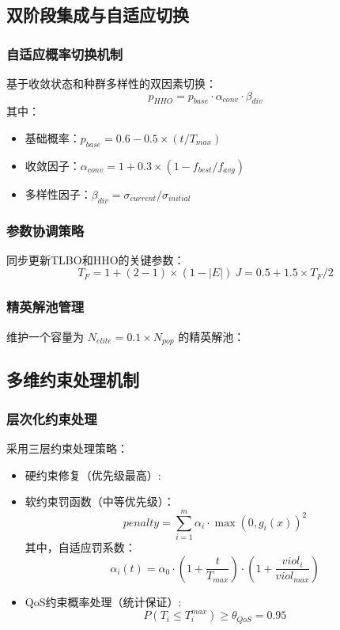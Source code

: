 \documentclass[conference]{IEEEtran}
\begin{document}
\subsection{双阶段集成与自适应切换}
\subsubsection{自适应概率切换机制}
基于收敛状态和种群多样性的双因素切换：
\begin{equation}
p_{HHO} = p_{base} \cdot \alpha_{conv} \cdot \beta_{div}
\end{equation}
其中：
\begin{itemize}
    \item 基础概率：$p_{base} = 0.6 - 0.5 \times (t/T_{max})$
    \item 收敛因子：$\alpha_{conv} = 1 + 0.3 \times (1 - f_{best}/f_{avg})$
    \item 多样性因子：$\beta_{div} =\sigma_{current}/\sigma_{initial}$
\end{itemize}
\subsubsection{参数协调策略}
同步更新TLBO和HHO的关键参数：
\begin{equation}
T_F = 1 + (2 - 1) \times (1 - |E|) \
J = 0.5 + 1.5 \times T_F / 2
\end{equation}
\subsubsection{精英解池管理}
维护一个容量为 $N_{elite} = 0.1 \times N_{pop}$ 的精英解池：
\subsection{多维约束处理机制}
\subsubsection{层次化约束处理}
采用三层约束处理策略：
\begin{itemize}
    \item 硬约束修复（优先级最高）:
    \item 软约束罚函数（中等优先级）：
        \begin{equation}
            penalty = \sum_{i=1}^{m} \alpha_i \cdot \max(0, g_i(x))^2
        \end{equation}
        其中，自适应罚系数：
        \begin{equation}
            \alpha_i(t) = \alpha_0 \cdot \left(1 + \frac{t}{T_{max}}\right) \cdot \left(1 + \frac{viol_i}{viol_{max}}\right)
        \end{equation}
    \item QoS约束概率处理（统计保证）:
        \begin{equation}
            P(T_i \leq T_i^{max}) \geq \theta_{QoS} = 0.95
        \end{equation}
\end{itemize}
\end{document}
